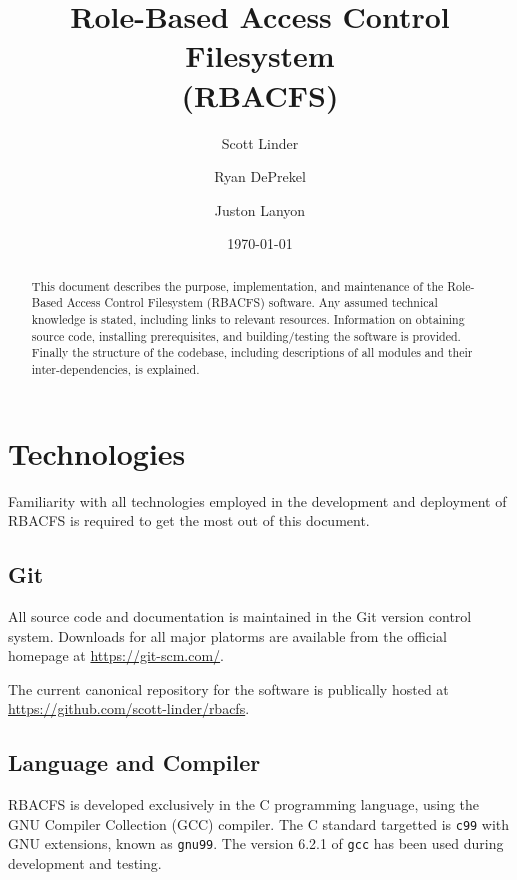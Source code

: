 \documentclass[11pt,oneside,letterpaper]{article}
\begin{document}
\title{
    Role-Based Access Control Filesystem\\
    (RBACFS)
}
\author{
    Scott Linder\\
    \and
    Ryan DePrekel\\
    \and
    Juston Lanyon
}
\date{\today}

\maketitle

\begin{abstract}
This document describes the purpose, implementation, and maintenance of the
Role-Based Access Control Filesystem (RBACFS) software. Any assumed technical
knowledge is stated, including links to relevant resources. Information on
obtaining source code, installing prerequisites, and building/testing the
software is provided. Finally the structure of the codebase, including
descriptions of all modules and their inter-dependencies, is explained.
\end{abstract}

\section{Technologies}

Familiarity with all technologies employed in the development and deployment of
RBACFS is required to get the most out of this document.

\subsection{Git}

All source code and documentation is maintained in the Git version control
system. Downloads for all major platorms are available from the official
homepage at \url{https://git-scm.com/}.

The current canonical repository for the software is publically hosted at
\url{https://github.com/scott-linder/rbacfs}.

\subsection{Language and Compiler}

RBACFS is developed exclusively in the C programming language, using the GNU
Compiler Collection (GCC) compiler. The C standard targetted is {\tt c99} with
GNU extensions, known as {\tt gnu99}. The version 6.2.1 of {\tt gcc} has been
used during development and testing.
\end{document}
